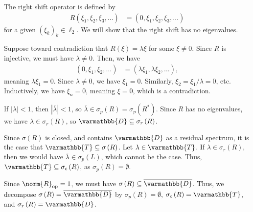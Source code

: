 \documentclass[10pt]{mypackage}
\renewcommand*{\mathbb}[1]{\varmathbb{#1}}
\begin{document}
\begin{example}
  The right shift operator is defined by
  \begin{align*}
    R\left(\xi_1,\xi_2,\xi_3,\dots\right) &= \left(0,\xi_1,\xi_2,\xi_3,\dots\right)
  \end{align*}
  for a given $\left(\xi_k\right)_k\in \ell_2$. We will show that the right shift has no eigenvalues.\newline

  Suppose toward contradiction that $R\left(\xi\right) = \lambda \xi$ for some $\xi\neq 0$. Since $R$ is injective, we must have $\lambda \neq 0$. Then, we have
  \begin{align*}
    \left(0,\xi_1,\xi_2,\dots\right) &= \left(\lambda \xi_1,\lambda \xi_2,\dots\right),
  \end{align*}
  meaning $\lambda \xi_1 =0$. Since $\lambda \neq 0$, we have $\xi_1 = 0$. Similarly, $\xi_2 = \xi_1/\lambda = 0$, etc. Inductively, we have $\xi_n = 0$, meaning $\xi = 0$, which is a contradiction.\newline

  If $\left\vert \lambda \right\vert < 1$, then $\left\vert \overline{\lambda} \right\vert < 1$, so $\overline{\lambda}\in \sigma_p\left(R\right) = \sigma_p\left(R^{\ast}\right)$. Since $R$ has no eigenvalues, we have $\lambda \in \sigma_r\left(R\right)$, so $\mathbb{D}\subseteq \sigma_r\left(R\right)$.\newline

  Since $\sigma\left(R\right)$ is closed, and contains $\mathbb{D}$ as a residual spectrum, it is the case that $\mathbb{T}\subseteq \sigma\left(R\right)$. Let $\lambda \in \mathbb{T}$. If $\lambda\in \sigma_r\left(R\right)$, then we would have $\overline{\lambda}\in \sigma_p\left(L\right)$, which cannot be the case. Thus, $\mathbb{T}\subseteq \sigma_c\left(R\right)$, as $\sigma_p\left(R\right) = \emptyset$.\newline

  Since $\norm{R}_{\text{op}} = 1$, we must have $\sigma\left(R\right)\subseteq \overline{\mathbb{D}}$. Thus, we decompose $\sigma\left(R\right) = \overline{\mathbb{D}}$ by $\sigma_p\left(R\right) = \emptyset$, $\sigma_c\left(R\right) = \mathbb{T}$, and $\sigma_r\left(R\right) = \mathbb{D}$.
\end{example}
\end{document}
